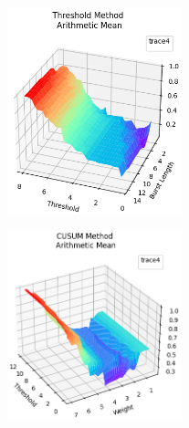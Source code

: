 \documentclass[aspectratio=169, 8pt]{beamer}
\begin{document}
\begin{frame}
\begin{columns}[T]
    \begin{column}{0.5\linewidth}
        \begin{figure}
            \centering
            \includegraphics[width = 0.45\textwidth]{images/Garrett_arithmetic_mean.png}            
            \label{fig:enter-label}
        \end{figure}
        \begin{figure}
            \centering
            \includegraphics[width = 0.45\textwidth]{images/Garrett_CUSUM_arithmetic_mean.png}
            \label{fig:enter-label}
        \end{figure}
    \end{column}
\end{columns}

\end{frame}
\end{document}
